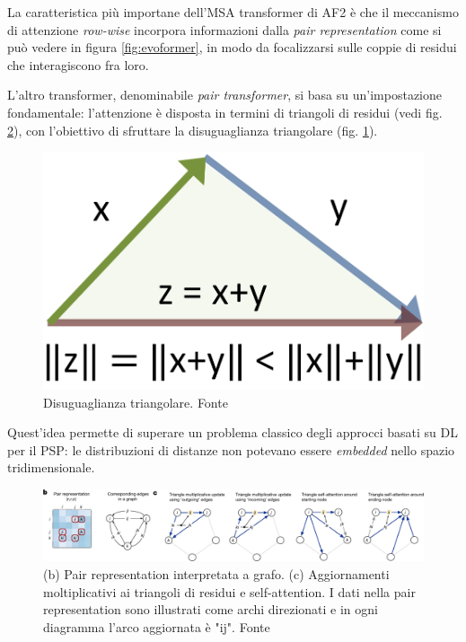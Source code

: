 \par La caratteristica più importane dell'MSA transformer di AF2 è che il meccanismo di attenzione \textit{row-wise} incorpora informazioni dalla \textit{pair representation} come si può vedere in figura \ref{fig:evoformer}, in modo da focalizzarsi sulle coppie di residui che interagiscono fra loro.

L'altro transformer, denominabile \textit{pair transformer}, si basa su un'impostazione fondamentale: l'attenzione è disposta in termini di triangoli di residui (vedi fig. \ref{fig:triangoli-residui}), con l'obiettivo di sfruttare la disuguaglianza triangolare (fig. \ref{fig:dis-triang}).

\begin{figure}[!htb]
	\centering
	\includegraphics[scale=0.15]{images/disuguaglianza triangolare.PNG}
	\caption{Disuguaglianza triangolare. Fonte\cite{disTriang}}
	\label{fig:dis-triang}
\end{figure}

Quest'idea permette di superare un problema classico degli approcci basati su DL per il PSP: le distribuzioni di distanze non potevano essere \textit{embedded} nello spazio tridimensionale. 

\begin{figure}[!htb]
	\centering
	\includegraphics[scale=0.42]{images/triangoli.png}
	\caption{(b) Pair representation interpretata a grafo. (c) Aggiornamenti moltiplicativi ai triangoli di residui e self-attention. I dati nella pair representation sono illustrati come archi direzionati e in ogni diagramma l'arco aggiornata è "ij". Fonte\cite{jumper2021highly}}
	\label{fig:triangoli-residui}
\end{figure}

